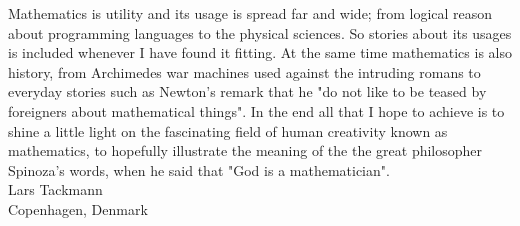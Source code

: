 \indent Mathematics is utility and its usage is spread far and wide; from logical reason about programming languages to the physical sciences. So stories about its usages is included whenever I have found it fitting. At the same time mathematics is also history, from Archimedes war machines used against the intruding romans to everyday stories such as Newton's remark that he "do not like to be teased by foreigners about mathematical things". In the end all that I hope to achieve is to shine a little light on the fascinating field of human creativity known as mathematics, to hopefully illustrate the meaning of the the great philosopher Spinoza's words, when he said that "God is a mathematician". \\
\flushright Lars Tackmann \\ Copenhagen, Denmark\flushleft


% 
% 
% 


